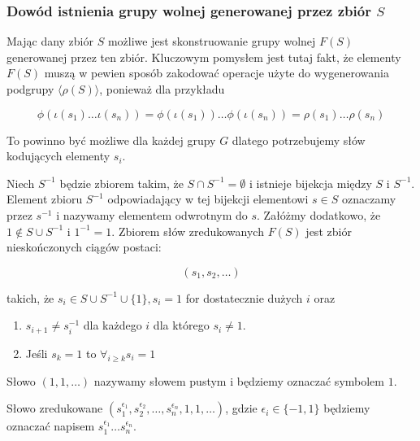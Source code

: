 \subsubsection{Dowód istnienia grupy wolnej generowanej przez zbiór $S$}
Mając dany zbiór $S$ możliwe jest skonstruowanie grupy wolnej $F(S)$ generowanej
przez ten zbiór.
Kluczowym pomysłem jest tutaj fakt, że elementy $F(S)$ muszą w pewien sposób
zakodować operacje użyte do wygenerowania podgrupy $\langle \rho(S) \rangle$,
ponieważ dla przykładu

\[
\phi\left(\iota\left(s_1\right) \ldots \iota\left(s_n\right)\right)
=
\phi\left(\iota\left(s_1\right)\right) \ldots \phi\left(\iota\left(s_n\right)\right)
=
\rho\left(s_1\right)\ldots\rho\left(s_n\right)\]

To powinno być możliwe dla każdej grupy $G$ dlatego potrzebujemy słów kodujących
elementy $s_i$.

\begin{defin}
  Niech $S^{-1}$ będzie zbiorem takim, że $S \cap S^{-1} = \emptyset$ i istnieje
  bijekcja między $S$ i $S^{-1}$.
  Element zbioru $S^{-1}$ odpowiadający w tej bijekcji elementowi $s \in S$
  oznaczamy przez $s^{-1}$ i nazywamy elementem odwrotnym do $s$.
  Załóżmy dodatkowo, że $1 \not \in S \cup S^{-1}$ i $1^{-1} = 1$.
  Zbiorem słów zredukowanych $F(S)$ jest zbiór nieskończonych ciągów postaci:

  \[(s_1, s_2, \ldots)\]

  takich, że $s_i \in S \cup S^{-1} \cup \{1\}, s_i = 1$ for dostatecznie dużych
  $i$ oraz

\begin{enumerate}
  \item $s_{i+1} \neq s_i^{-1}$ dla każdego $i$ dla którego $s_i \neq 1$.
  \item Jeśli $s_k = 1$ to $\forall_{i \geq k} s_i = 1$
\end{enumerate}
\end{defin}

Słowo $(1,1,\ldots)$ nazywamy słowem pustym i będziemy oznaczać symbolem $1$.

Słowo zredukowane $
(s_1^{\epsilon_1},
s_2^{\epsilon_2}, \ldots,
s_n^{\epsilon_n}, 1, 1, \ldots)$,
gdzie $\epsilon_i \in \{-1, 1\}$ będziemy oznaczać napisem
$s_1^{\epsilon_1}\ldots s_n^{\epsilon_n}$.

